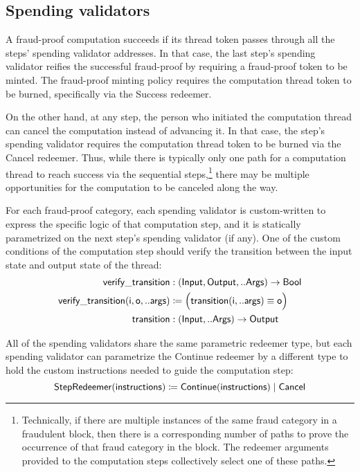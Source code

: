 \documentclass[../midgard.tex]{subfiles}
\begin{document}
\subsection{Spending validators}
\label{h:fraud-proof-computation-threads-spending-validators}

A fraud-proof computation succeeds if its thread token passes through all the steps' spending validator addresses.
In that case, the last step's spending validator reifies the successful fraud-proof by requiring a fraud-proof token to be minted.
The fraud-proof minting policy requires the computation thread token to be burned, specifically via the Success redeemer.

On the other hand, at any step, the person who initiated the computation thread can cancel the computation instead of advancing it.
In that case, the step's spending validator requires the computation thread token to be burned via the Cancel redeemer.
Thus, while there is typically only one path for a computation thread to reach success via the sequential steps,\footnote{Technically, if there are multiple instances of the same fraud category in a fraudulent block, then there is a corresponding number of paths to prove the occurrence of that fraud category in the block.
The redeemer arguments provided to the computation steps collectively select one of these paths.} there may be multiple opportunities for the computation to be canceled along the way.

For each fraud-proof category, each spending validator is custom-written to express the specific logic of that computation step, and it is statically parametrized on the next step's spending validator (if any).
One of the custom conditions of the computation step should verify the transition between the input state and output state of the thread:
\begin{align*}
    \mathsf{verify\_transition} &: (\mathsf{Input}, \mathsf{Output}, ..\mathsf{Args}) -> \mathsf{Bool} \\
    \mathsf{verify\_transition(i, o, ..args)} &\coloneq
        \Bigl( \mathsf{transition(i, ..args) \equiv \mathsf{o}} \Bigr) \\
    \mathsf{transition} &: (\mathsf{Input}, ..\mathsf{Args}) -> \mathsf{Output}
\end{align*}

All of the spending validators share the same parametric redeemer type, but each spending validator can parametrize the Continue redeemer by a different type to hold the custom instructions needed to guide the computation step:
\begin{equation*}
    \mathsf{StepRedeemer} (\mathsf{instructions}) \coloneq
        \mathsf{Continue}(\mathsf{instructions}) \;|\;
        \mathsf{Cancel}
\end{equation*}
\end{document}
